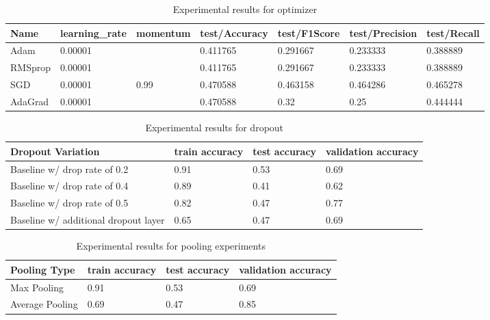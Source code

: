 \documentclass{article}
\begin{document}
\begin{table}[h!]
    \centering
    \caption{Experimental results for optimizer}
    \label{table:optim}
    \begin{tabular}{lllllll}
        \toprule
            Name    & learning\_rate & momentum & test/Accuracy & test/F1Score & test/Precision & test/Recall \\ \midrule
            Adam    & 0.00001        &          & 0.411765      & 0.291667     & 0.233333       & 0.388889    \\
            RMSprop & 0.00001        &          & 0.411765      & 0.291667     & 0.233333       & 0.388889    \\
            SGD     & 0.00001        & 0.99     & 0.470588      & 0.463158     & 0.464286       & 0.465278    \\
            AdaGrad & 0.00001        &          & 0.470588      & 0.32         & 0.25           & 0.444444  \\ 
        \bottomrule
    \end{tabular}
\end{table}

\begin{table}[h!]
    \centering    
    \caption{Experimental results for dropout}
    \label{table:drop}
    \begin{tabular}{llll}
        \toprule
        \centering
        {Dropout Variation} & train accuracy & test accuracy & validation accuracy \\
        \midrule
         Baseline w/ drop rate of 0.2 & 0.91  & 0.53 & 0.69 \\
         Baseline w/ drop rate of 0.4  & 0.89 & 0.41 & 0.62  \\
         Baseline w/ drop rate of 0.5 & 0.82 & 0.47 & 0.77 \\
         Baseline w/ additional dropout layer & 0.65 & 0.47 & 0.69 \\
        \bottomrule
    \end{tabular}
\end{table}

\begin{table}[h!]
    \centering    
    \caption{Experimental results for pooling experiments}
    \label{table:pool}
    \begin{tabular}{llll}
        \toprule
        \centering
        {Pooling Type} & train accuracy & test accuracy & validation accuracy \\
        \midrule
         Max Pooling & 0.91  & 0.53 & 0.69 \\
         Average Pooling  & 0.69 & 0.47 & 0.85  \\
        \bottomrule
    \end{tabular}
\end{table}
\end{document}
